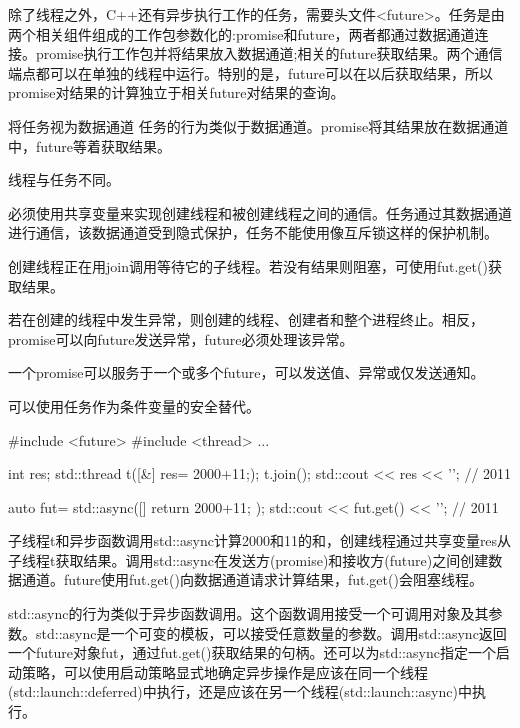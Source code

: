 除了线程之外，C++还有异步执行工作的任务，需要头文件<future>。任务是由两个相关组件组成的工作包参数化的:promise和future，两者都通过数据通道连接。promise执行工作包并将结果放入数据通道;相关的future获取结果。两个通信端点都可以在单独的线程中运行。特别的是，future可以在以后获取结果，所以promise对结果的计算独立于相关future对结果的查询。

\begin{myTip}{将任务视为数据通道}
任务的行为类似于数据通道。promise将其结果放在数据通道中，future等着获取结果。

\end{myTip}


线程与任务不同。

必须使用共享变量来实现创建线程和被创建线程之间的通信。任务通过其数据通道进行通信，该数据通道受到隐式保护，任务不能使用像互斥锁这样的保护机制。

创建线程正在用join调用等待它的子线程。若没有结果则阻塞，可使用fut.get()获取结果。

若在创建的线程中发生异常，则创建的线程、创建者和整个进程终止。相反，promise可以向future发送异常，future必须处理该异常。

一个promise可以服务于一个或多个future，可以发送值、异常或仅发送通知。

可以使用任务作为条件变量的安全替代。

\begin{cpp}
#include <future>
#include <thread>
...

int res;
std::thread t([&]{ res= 2000+11;});
t.join();
std::cout << res << '\n'; // 2011

auto fut= std::async([]{ return 2000+11; });
std::cout << fut.get() << '\n'; // 2011
\end{cpp}

子线程t和异步函数调用std::async计算2000和11的和，创建线程通过共享变量res从子线程t获取结果。调用std::async在发送方(promise)和接收方(future)之间创建数据通道。future使用fut.get()向数据通道请求计算结果，fut.get()会阻塞线程。


std::async的行为类似于异步函数调用。这个函数调用接受一个可调用对象及其参数。std::async是一个可变的模板，可以接受任意数量的参数。调用std::async返回一个future对象fut，通过fut.get()获取结果的句柄。还可以为std::async指定一个启动策略，可以使用启动策略显式地确定异步操作是应该在同一个线程(std::launch::deferred)中执行，还是应该在另一个线程(std::launch::async)中执行。

